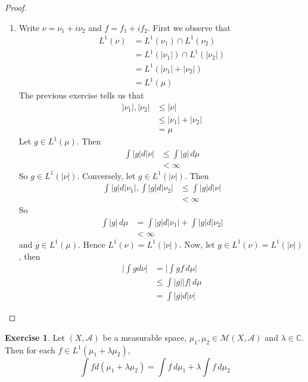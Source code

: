 \documentclass{book}
\theoremstyle{definition}
\newtheorem{ex}[definition]{Exercise}
\newcommand{\lam}{\lambda}
\newcommand{\C}{\mathbb{C}}
\newcommand{\MA}{\mathcal{A}}
\newcommand{\MM}{\mathcal{M}}
\newcommand{\lex}[1]{\label{ex:#1}}
\DeclareMathOperator*{\0}{\mbf{0}}
\DeclareMathOperator*{\1}{\mbf{1}}
\newcommand{\dmu}{\, d \mu}
\begin{document}
\begin{proof}
\begin{enumerate}
			A previous exercise tells us that $|f| \neq 0$ $|\nu|$-a.e. Thus $|g|=1$ $|\nu|$-a.e.\\
			\item Write $\nu = \nu_1 + i\nu_2$ and $f = f_1 + if_2$. First we observe that
			\begin{align*}
				L^1(\nu)
				&= L^1(\nu_1) \cap L^1(\nu_2) \\
				&= L^1(|\nu_1|) \cap L^1(|\nu_2|)\\
				&= L^1(|\nu_1| + |\nu_2|)\\
				&= L^1(\mu)
			\end{align*}
			The previous exercise tells us that 
			\begin{align*}
				|\nu_1|, |\nu_2| 
				&\leq |\nu| \\
				&\leq |\nu_1|+ |\nu_2| \\
				&= \mu
			\end{align*}
			Let $g \in L^1(\mu)$. Then 
			\begin{align*}
				\int |g| d |\nu| 
				&\leq \int |g| \dmu \\
				&< \infty
			\end{align*}
			So $g \in L^1(|\nu|)$.
			Conversely, let $g \in L^1(|\nu|)$. Then 
			\begin{align*}
				\int |g| d|\nu_1|, \int |g| d |\nu_2| 
				& \leq \int |g|d |\nu|\\
				& < \infty
			\end{align*}
			So 
			\begin{align*}
				\int |g| \dmu
				& =\int |g| d|\nu_1| + \int |g| d |\nu_2| \\
				& < \infty
			\end{align*}
			and $g \in L^1(\mu)$. Hence $L^1(\nu) = L^1(|\nu|)$. 
			Now, let $g \in L^1(\nu) = L^1(|\nu|)$, then 
			\begin{align*}
				\bigg| \int g d\nu \bigg| 
				&= \bigg| \int g f \dmu \bigg| \\
				& \leq \int |g||f|\dmu\\
				& = \int |g| d |\nu|
			\end{align*}
			
		\end{enumerate}
	\end{proof}


	\begin{ex} \lex{43010} 
	Let $(X, \MA)$ be a measurable space, $\mu_1, \mu_2 \in \MM(X, \MA)$ and $\lam \in \C$. Then for each $f \in L^1(\mu_1 + \lam \mu_2)$, $$\int f d(\mu_1 + \lam \mu_2) = \int f \dmu_1 + \lam \int f \dmu_2$$
	\end{ex}
	
\end{document}
